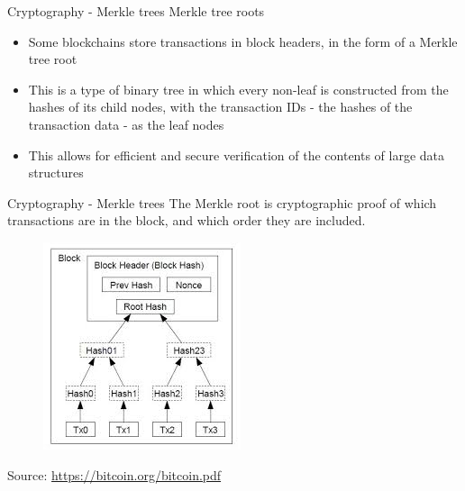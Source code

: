 \documentclass[10pt]{beamer}
\begin{document}

\begin{frame}{Cryptography - Merkle trees}
	Merkle tree roots
	\begin{itemize}
		\item Some blockchains store transactions in block headers, in the form of a Merkle tree root
		\item This is a type of binary tree in which every non-leaf is constructed from the hashes of its child nodes, with the transaction IDs - the hashes of the transaction data - as the leaf nodes
		\item This allows for efficient and secure verification of the contents of large data structures
	\end{itemize}
\end{frame}


\begin{frame}{Cryptography - Merkle trees}
	The Merkle root is cryptographic proof of which transactions are in the block, and which order they are included.
	\begin{figure}[]
		\centering
		\includegraphics  [scale=0.5]{Images/images}
	\end{figure}
	\begin{tiny}
		Source: \href{https://bitcoin.org/bitcoin.pdf}{https://bitcoin.org/bitcoin.pdf}
	\end{tiny}
\end{frame}

\end{document}
